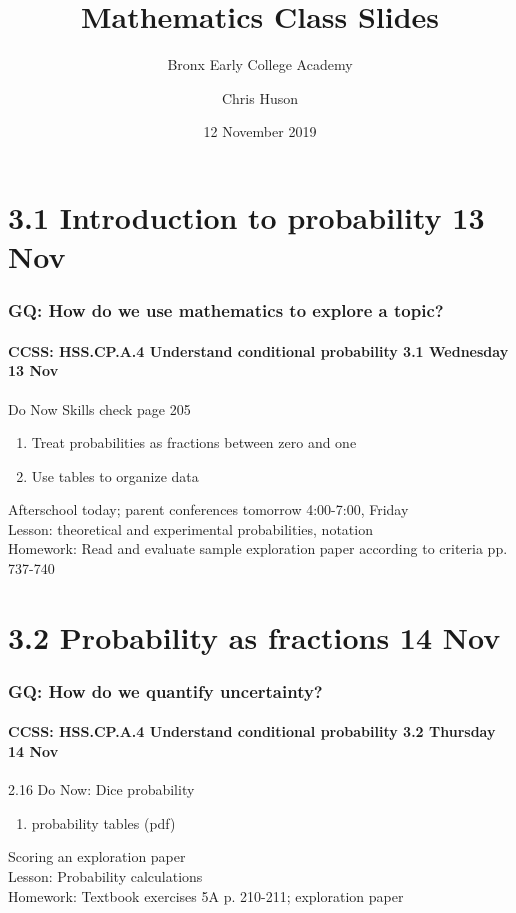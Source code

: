 \documentclass{beamer}
\title{Mathematics Class Slides}
\subtitle{Bronx Early College Academy}
\author{Chris Huson}
\date{12 November 2019}
\begin{document}
\frame{\titlepage}
\section[Outline]{}
\frame{\tableofcontents}


\section{3.1 Introduction to probability 13 Nov}
\frame
{
  \frametitle{GQ: How do we use mathematics to explore a topic?}
  \framesubtitle{CCSS: HSS.CP.A.4 Understand conditional probability \hfill \alert{3.1 Wednesday 13 Nov}}

  \begin{block}{Do Now Skills check page 205}
  \begin{enumerate}
      \item Treat probabilities as fractions between zero and one 
      \item Use tables to organize data
  \end{enumerate}
  \end{block}
  Afterschool today; parent conferences tomorrow 4:00-7:00, Friday\\ \smallskip
  Lesson: theoretical and experimental probabilities, notation \\ \smallskip
  Homework: Read and evaluate sample exploration paper according to criteria pp. 737-740
}

\section{3.2 Probability as fractions 14 Nov}
\frame
{
  \frametitle{GQ: How do we quantify uncertainty?}
  \framesubtitle{CCSS: HSS.CP.A.4 Understand conditional probability \hfill \alert{3.2 Thursday 14 Nov}}

  \begin{block}{2.16 Do Now: Dice probability}
  \begin{enumerate}
      \item probability tables (pdf)
  \end{enumerate}
  \end{block}
  Scoring an exploration paper \\
  Lesson: Probability calculations \\ \smallskip
  Homework: Textbook exercises 5A p. 210-211; exploration paper
}
\end{document}
